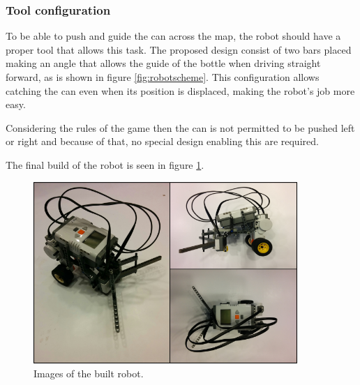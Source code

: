 \subsubsection{Tool configuration}

To be able to push and guide the can across the map, the robot should have a proper tool that allows this task. 
The proposed design consist of two bars placed making an angle that allows the guide of the bottle when driving straight forward, as is shown in figure \ref{fig:robotscheme}.
This configuration allows catching the can even when its position is displaced, making the robot's job more easy.

Considering the rules of the game then the can is not permitted to be pushed left or right and because of that, no special design enabling this are required.


The final build of the robot is seen in figure \ref{fig:robotImage}.

\begin{figure}[H]
\includegraphics[width=10cm]{Fig1.png}
\centering
\caption{Images of the built robot.}
\label{fig:robotImage}
\end{figure}